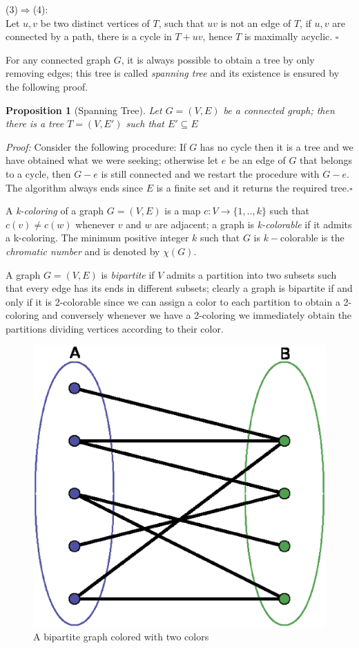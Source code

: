 \documentclass[a4paper,12pt,oneside]{book}
\newtheorem{proposition}[theorem]{Proposition}
\newcommand*{\QED}{\hfill\ensuremath{\square}}
\begin{document}
(3)$\Rightarrow$(4):\\
Let $u,v$ be two distinct vertices of $T$, such that $uv$ is not an edge of $T$, if $u,v$ are connected by a path, there is a cycle in $T+uv$, hence $T$ is maximally acyclic. \QED

 For any connected graph $G$, it is always possible to obtain a tree by only removing edges; this tree is called \textit{spanning tree} and its existence is ensured by the following proof.
\begin{proposition}[Spanning Tree]
Let $G=(V,E)$ be a connected graph; then there is a tree $T=(V,E')$ such that $E'\subseteq E$
\end{proposition}
\textit{Proof:}
Consider the following procedure: If $G$ has no cycle then it is a tree and we have obtained what we were seeking; otherwise let $e$ be an edge of $G$ that belongs to a cycle, then $G-e$ is still connected and we restart the procedure with $G-e$.
The algorithm always ends since $E$ is a finite set and it returns the required tree.\QED


A \textit{k-coloring} of a graph $G=(V,E)$ is a map $c:V \rightarrow \{1,..,k\} $ such that $c(v) \neq c(w) $ whenever $v$ and $w$ are adjacent; a graph is \textit{k-colorable} if it admits a k-coloring. The minimum positive integer $k$ such that $G$ is $k-$colorable is the \textit{chromatic number} and is denoted by $\chi (G)$.

A graph $G=(V,E)$ is \textit{bipartite} if $V$ admits a partition into two subsets such that every edge has its ends in different subsets; clearly a graph is bipartite if and only if it is 2-colorable since we can assign a color to each partition to obtain a 2-coloring and conversely whenever we have a 2-coloring we immediately obtain the partitions dividing vertices according to their color. 
\begin{figure} 
\begin{center}
\includegraphics[scale=0.28]{bipartite.eps}
\caption{A bipartite graph colored with two colors}\label{bip}
\end{center}
\end{figure}
\end{document}
